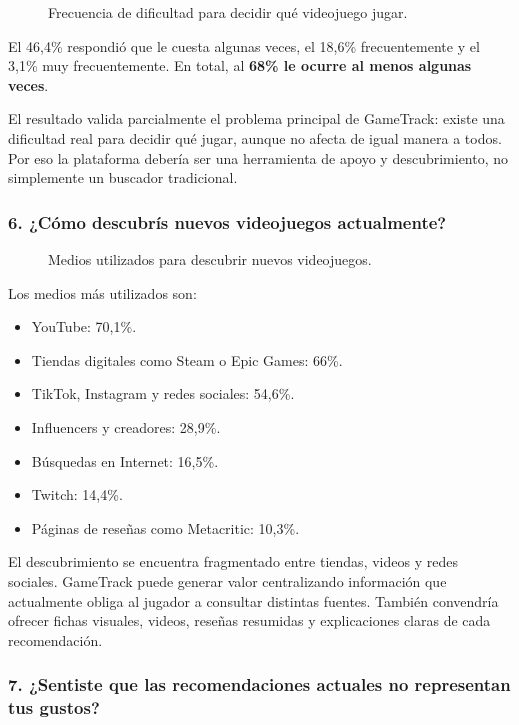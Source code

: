 \begin{figure}[H]
	\centering
	\caption{Frecuencia de dificultad para decidir qué videojuego jugar.}
	\label{fig:enc-p05}
\end{figure}

El 46,4\% respondió que le cuesta algunas veces, el 18,6\% frecuentemente y el 3,1\% muy frecuentemente. En total, al \textbf{68\% le ocurre al menos algunas veces}.

El resultado valida parcialmente el problema principal de GameTrack: existe una dificultad real para decidir qué jugar, aunque no afecta de igual manera a todos. Por eso la plataforma debería ser una herramienta de apoyo y descubrimiento, no simplemente un buscador tradicional.

\subsubsection*{6. ¿Cómo descubrís nuevos videojuegos actualmente?}

\begin{figure}[H]
	\centering
	\caption{Medios utilizados para descubrir nuevos videojuegos.}
	\label{fig:enc-p06}
\end{figure}

Los medios más utilizados son:

\begin{itemize}
	\item YouTube: 70,1\%.
	\item Tiendas digitales como Steam o Epic Games: 66\%.
	\item TikTok, Instagram y redes sociales: 54,6\%.
	\item Influencers y creadores: 28,9\%.
	\item Búsquedas en Internet: 16,5\%.
	\item Twitch: 14,4\%.
	\item Páginas de reseñas como Metacritic: 10,3\%.
\end{itemize}

El descubrimiento se encuentra fragmentado entre tiendas, videos y redes sociales. GameTrack puede generar valor centralizando información que actualmente obliga al jugador a consultar distintas fuentes. También convendría ofrecer fichas visuales, videos, reseñas resumidas y explicaciones claras de cada recomendación.

\subsubsection*{7. ¿Sentiste que las recomendaciones actuales no representan tus gustos?}

